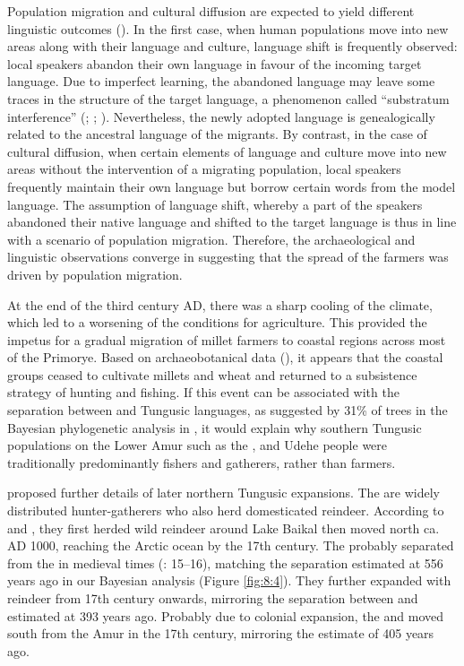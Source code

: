 \documentclass[output=paper,colorlinks,citecolor=brown]{langscibook}
\begin{document}
Population migration and cultural diffusion are expected to yield different linguistic outcomes (\citealt{Thomason1988}). In the first case, when human populations move into new areas along with their language and culture, language shift is frequently observed: local speakers abandon their own language in favour of the incoming target language. Due to imperfect learning, the abandoned language may leave some traces in the structure of the target language, a phenomenon called “substratum interference” (\citealt{VanCoetsem2000}; \citealt{Johanson2002}; \citealt{Winford2013}). Nevertheless, the newly adopted language is genealogically related to the ancestral language of the migrants. By contrast, in the case of cultural diffusion, when certain elements of language and culture move into new areas without the intervention of a migrating population, local speakers frequently maintain their own language but borrow certain words from the model language. 
The assumption of language shift, whereby a part of the  speakers abandoned their native language and shifted to the  target language is thus in line with a scenario of population migration. Therefore, the archaeological and linguistic observations converge in suggesting that the spread of the  farmers was driven by population migration. 

At the end of the third century AD, there was a sharp cooling of the climate, which led to a worsening of the conditions for agriculture. This provided the impetus for a gradual migration of millet farmers to coastal regions across most of the Primorye. Based on archaeobotanical data (\citealt{Yanuševič1990}), it appears that the coastal groups ceased to cultivate millets and wheat and returned to a subsistence strategy of hunting and fishing. If this event can be associated with the separation between  and Tungusic languages, as suggested by 31\% of trees in the Bayesian phylogenetic analysis in \citet{Oskolskayaetal2022}, it would explain why southern Tungusic populations on the Lower Amur such as the ,  and Udehe people were traditionally predominantly fishers and gatherers, rather than farmers.

\citet{Hudson2020} proposed further details of later northern Tungusic expansions. The  are widely distributed hunter-gatherers who also herd domesticated reindeer. According to \citet[142]{Anderson1999} and \citet[166]{Zgusta2015}, they first herded wild reindeer around Lake Baikal then moved north ca. AD 1000, reaching the Arctic ocean by the 17th century. The  probably separated from the  in medieval times (\citealt{Pakendorf2007}: 15--16), matching the separation estimated at 556 years ago in our Bayesian analysis (Figure \ref{fig:8:4}). They further expanded with reindeer from 17th century onwards, mirroring the separation between  and  estimated at 393 years ago. Probably due to  colonial expansion, the  and  moved south from the Amur in the 17th century, mirroring the estimate of 405 years ago.  
\end{document}
